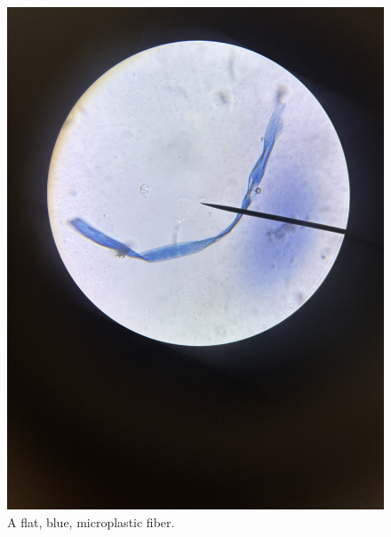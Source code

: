 \documentclass[fleqn,10pt]{SelfArx} %
\begin{document}
	\begin{figure}[h]
		\centering
		\includegraphics[width=1\linewidth]{Figures/BlueTwisty}
		\caption[Blue Microplastic Under Microscope]{A flat, blue, microplastic fiber.}
		\label{fig:bluetwist}
	\end{figure}
\end{document}
